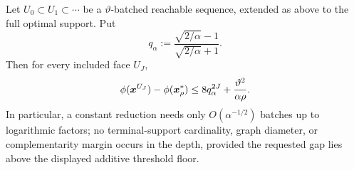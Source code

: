 \begin{theorem}
\label{thm:batch-depth}
Let $U_0\subset U_1\subset\cdots$ be a $\vartheta$-batched reachable
sequence, extended as above to the full optimal support.  Put
\begin{equation}
 q_\alpha:=
 \frac{\sqrt{2/\alpha}-1}{\sqrt{2/\alpha}+1}.
 \label{eq:batch-q}
\end{equation}
Then for every included face $U_J$,
\begin{equation}
 \phi(\bm{x}^{U_J})-\phi(\bm{x}_\rho^*)
 \leq 8q_\alpha^{2J}+\frac{\vartheta^2}{\alpha\rho}.
 \label{eq:batch-depth-gap}
\end{equation}
In particular, a constant reduction needs only
$O(\alpha^{-1/2})$ batches up to logarithmic factors; no terminal-support
cardinality, graph diameter, or complementarity margin occurs in the depth,
provided the requested gap lies above the displayed additive threshold floor.
\end{theorem}

